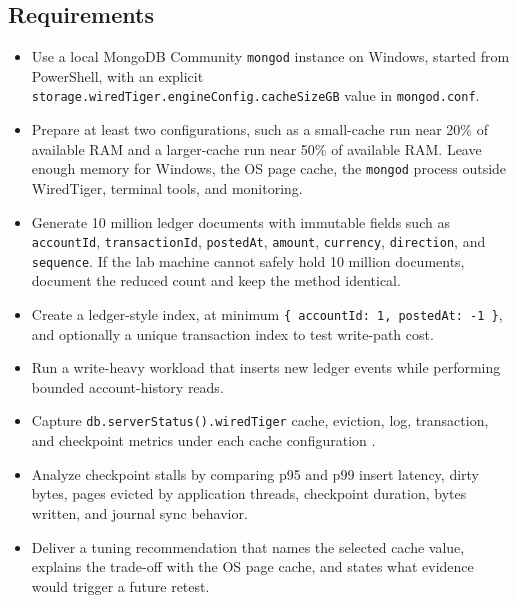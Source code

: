 \subsection*{Requirements}
\begin{itemize}
    \item Use a local MongoDB Community \texttt{mongod} instance on Windows, started from PowerShell, with an explicit \texttt{storage.wiredTiger.engineConfig.cacheSizeGB} value in \texttt{mongod.conf}.
    \item Prepare at least two configurations, such as a small-cache run near 20\% of available RAM and a larger-cache run near 50\% of available RAM. Leave enough memory for Windows, the OS page cache, the \texttt{mongod} process outside WiredTiger, terminal tools, and monitoring.
    \item Generate 10 million ledger documents with immutable fields such as \texttt{accountId}, \texttt{transactionId}, \texttt{postedAt}, \texttt{amount}, \texttt{currency}, \texttt{direction}, and \texttt{sequence}. If the lab machine cannot safely hold 10 million documents, document the reduced count and keep the method identical.
    \item Create a ledger-style index, at minimum \texttt{\{ accountId: 1, postedAt: -1 \}}, and optionally a unique transaction index to test write-path cost.
    \item Run a write-heavy workload that inserts new ledger events while performing bounded account-history reads.
    \item Capture \texttt{db.serverStatus().wiredTiger} cache, eviction, log, transaction, and checkpoint metrics under each cache configuration \cite{mongodbServerStatusDocs}.
    \item Analyze checkpoint stalls by comparing p95 and p99 insert latency, dirty bytes, pages evicted by application threads, checkpoint duration, bytes written, and journal sync behavior.
    \item Deliver a tuning recommendation that names the selected cache value, explains the trade-off with the OS page cache, and states what evidence would trigger a future retest.
\end{itemize}

